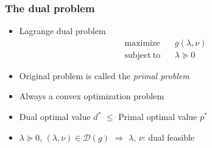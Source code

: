 \subsubsection*{The dual problem}
\begin{itemize}
    \item Lagrange dual problem
    \begin{equation}\begin{aligned}
        \mathrm{maximize}~~&~~g(\lambda,\nu) \\
        \mathrm{subject~to}~~&~~\lambda\succeq 0
    \end{aligned}\end{equation}
    \item Original problem is called the \textit{primal problem}
    \item Always a convex optimization problem
    \item Dual optimal value $d^\ast$ $\leq$ Primal optimal value $p^\ast$
    \item $\lambda\succeq 0$, $(\lambda,\nu)\in\mathcal{D}(g)$ $\Rightarrow$ $\lambda$, $\nu$: dual feasible
\end{itemize}

